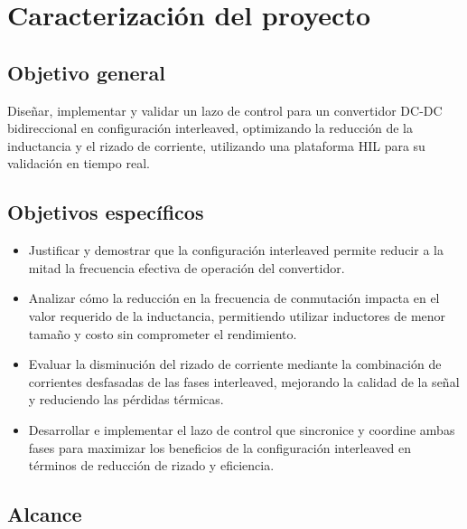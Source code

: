 \section{Caracterización del proyecto}

\subsection{Objetivo general}
Diseñar, implementar y validar un lazo de control para un convertidor DC-DC bidireccional en configuración interleaved, optimizando la reducción de la inductancia y el rizado de corriente, utilizando una plataforma HIL para su validación en tiempo real.
\subsection{Objetivos específicos}
\begin{itemize}
    \item Justificar y demostrar que la configuración interleaved permite reducir a la mitad la frecuencia efectiva de operación del convertidor.

    \item Analizar cómo la reducción en la frecuencia de conmutación impacta en el valor requerido de la inductancia, permitiendo utilizar inductores de menor tamaño y costo sin comprometer el rendimiento.

    \item Evaluar la disminución del rizado de corriente mediante la combinación de corrientes desfasadas de las fases interleaved, mejorando la calidad de la señal y reduciendo las pérdidas térmicas.

    \item Desarrollar e implementar el lazo de control que sincronice y coordine ambas fases para maximizar los beneficios de la configuración interleaved en términos de reducción de rizado y eficiencia.
\end{itemize}







\subsection{Alcance}
